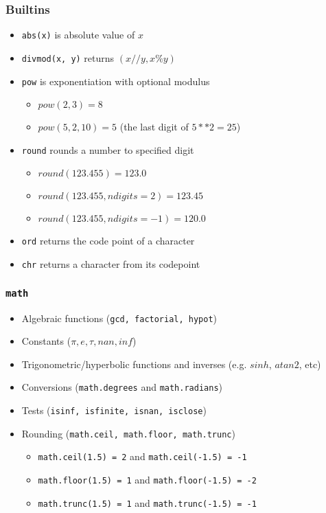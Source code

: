 \documentclass{beamer}
\begin{document}
\begin{frame}
  \frametitle{Builtins}

  \begin{itemize}
  \item \texttt{abs(x)} is absolute value of $x$
  \item \texttt{divmod(x, y)} returns $(x//y, x \% y)$
  \item \texttt{pow} is exponentiation with optional modulus
    \begin{itemize}
      \item $pow(2, 3) = 8$
      \item $pow(5, 2, 10) = 5$ (the last digit of $5**2=25$)
    \end{itemize}
  \item \texttt{round} rounds a number to specified digit
    \begin{itemize}
      \item $round(123.455) = 123.0$
      \item $round(123.455, ndigits=2) = 123.45$
      \item $round(123.455, ndigits=-1) = 120.0$
    \end{itemize}
  \item \texttt{ord} returns the code point of a character
  \item \texttt{chr} returns a character from its codepoint
  \end{itemize}
\end{frame}

\begin{frame}
  \frametitle{\texttt{math}}

  \begin{itemize}
    \item Algebraic functions (\texttt{gcd, factorial, hypot})
    \item Constants ($\pi, e, \tau, nan, inf$)
    \item Trigonometric/hyperbolic functions and inverses (e.g. $sinh$, $atan2$, etc)
    \item Conversions (\texttt{math.degrees} and \texttt{math.radians})
    \item Tests (\texttt{isinf, isfinite, isnan, isclose})
    \item Rounding (\texttt{math.ceil, math.floor, math.trunc})
      \begin{itemize}
        \item \texttt{math.ceil(1.5) = 2} and \texttt{math.ceil(-1.5) = -1}
        \item \texttt{math.floor(1.5) = 1} and \texttt{math.floor(-1.5) = -2}
        \item \texttt{math.trunc(1.5) = 1} and \texttt{math.trunc(-1.5) = -1}
      \end{itemize}
  \end{itemize}
\end{frame}
\end{document}
